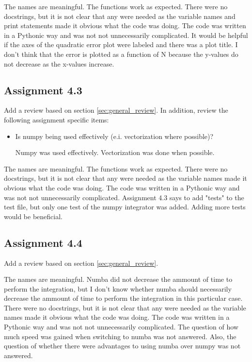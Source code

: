 \documentclass[a4paper]{article}
\begin{document}
The names are meaningful. The functions work as expected. There were no docstrings, but it is not clear that any were needed as the variable names and print statements made it obvious what the code was doing. The code was written in a Pythonic way and was not not unnecessarily complicated. It would be helpful if the axes of the quadratic error plot were labeled and there was a plot title. I don't think that the error is plotted as a function of N because the y-values do not decrease as the x-values increase.

\subsection*{Assignment 4.3}
Add a review based on section \ref{sec:general_review}. In addition, review the following assignment specific items: 
\begin{itemize}
  \item Is numpy being used effectively (e.i. vectorization where possible)?
  \bigskip
  
  Numpy was used effectively. Vectorization was done when possible.
\end{itemize}
\bigskip

The names are meaningful. The functions work as expected. There were no docstrings, but it is not clear that any were needed as the variable names made it obvious what the code was doing. The code was written in a Pythonic way and was not not unnecessarily complicated. Assignment 4.3 says to add "tests" to the test file, but only one test of the numpy integrator was added. Adding more tests would be beneficial. 
\subsection*{Assignment 4.4}
Add a review based on section \ref{sec:general_review}.

\bigskip

The names are meaningful. Numba did not decrease the ammount of time to perform the integration, but I don't know whether numba should necessarily decrease the ammount of time to perform the integration in this particular case. There were no docstrings, but it is not clear that any were needed as the variable names made it obvious what the code was doing. The code was written in a Pythonic way and was not not unnecessarily complicated. The question of how much speed was gained when switching to numba was not answered. Also, the question of whether there were advantages to using numba over numpy was not answered.
\end{document}
